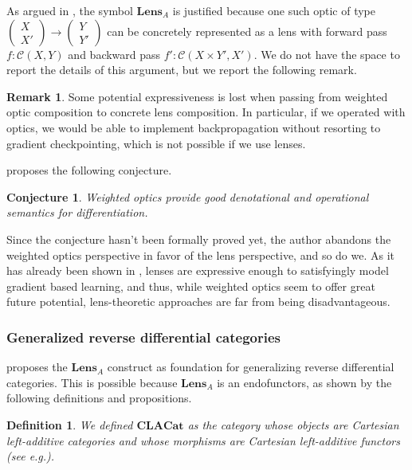 \documentclass[12pt,a4paper,openright,twoside]{report}
\theoremstyle{plain}
\newtheorem{definition}[proposition]{Definition}
\newtheorem{conjecture}[proposition]{Conjecture}
\theoremstyle{definition}
\newtheorem{remark}[proposition]{Remark}
\begin{document}
As argued in \cite{gavranovic2024fundamental}, the symbol $\mathbf{Lens}_A$ is justified because one such optic of type $\left(\begin{smallmatrix}X \\ X'\end{smallmatrix}\right) \to \left(\begin{smallmatrix}Y \\ Y'\end{smallmatrix}\right)$ can be concretely represented as a lens with forward pass $f : \mathcal{C}(X,Y)$ and backward pass $f' : \mathcal{C}(X \times Y',X')$. We do not have the space to report the details of this argument, but we report the following remark.

\begin{remark}
  Some potential expressiveness is lost when passing from weighted optic composition to concrete lens composition. In particular, if we operated with optics, we would be able to implement backpropagation without resorting to gradient checkpointing, which is not possible if we use lenses. 
\end{remark}


\cite{gavranovic2024fundamental} proposes the following conjecture.

\begin{conjecture}
  Weighted optics provide good denotational and operational semantics for differentiation.
\end{conjecture}

Since the conjecture hasn't been formally proved yet, the author abandons the weighted optics perspective in favor of the lens perspective, and so do we. As it has already been shown in \cite{cruttwell2022categorical}, lenses are expressive enough to satisfyingly model gradient based learning, and thus, while weighted optics seem to offer great future potential, lens-theoretic approaches are far from being disadvantageous.


\subsubsection{Generalized reverse differential categories}

\cite{gavranovic2024fundamental} proposes the $\mathbf{Lens}_A$ construct as foundation for generalizing reverse differential categories. This is possible because $\mathbf{Lens}_A$ is an endofunctors, as shown by the following definitions and propositions.

\begin{definition}
  We defined $\mathbf{CLACat}$ as the category whose objects are Cartesian left-additive categories and whose morphisms are Cartesian left-additive functors (see e.g.\cite{blute2006differential}).
\end{definition}
\end{document}
